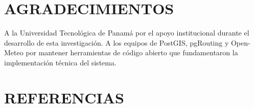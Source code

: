 \documentclass[10pt,letterpaper,twocolumn]{article}
\begin{document}
\section*{AGRADECIMIENTOS}

A la Universidad Tecnol\'{o}gica de Panam\'{a} por el apoyo institucional
durante el desarrollo de esta investigaci\'{o}n. A los equipos de
PostGIS, pgRouting y Open-Meteo por mantener herramientas de c\'{o}digo
abierto que fundamentaron la implementaci\'{o}n t\'{e}cnica del sistema.

\section*{REFERENCIAS}
\end{document}
